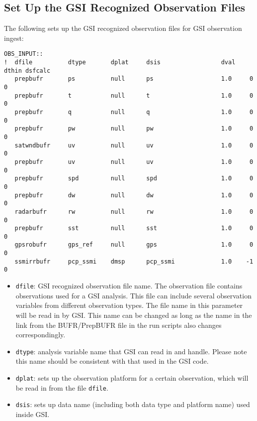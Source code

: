 \subsection{Set Up the GSI Recognized Observation Files}

The following sets up the GSI recognized observation files for GSI observation ingest:

\begin{scriptsize}
\begin{verbatim}
OBS_INPUT::
!  dfile          dtype       dplat     dsis                 dval    dthin dsfcalc
   prepbufr       ps          null      ps                   1.0     0     0
   prepbufr       t           null      t                    1.0     0     0
   prepbufr       q           null      q                    1.0     0     0
   prepbufr       pw          null      pw                   1.0     0     0
   satwndbufr     uv          null      uv                   1.0     0     0
   prepbufr       uv          null      uv                   1.0     0     0
   prepbufr       spd         null      spd                  1.0     0     0
   prepbufr       dw          null      dw                   1.0     0     0
   radarbufr      rw          null      rw                   1.0     0     0
   prepbufr       sst         null      sst                  1.0     0     0
   gpsrobufr      gps_ref     null      gps                  1.0     0     0
   ssmirrbufr     pcp_ssmi    dmsp      pcp_ssmi             1.0    -1     0
\end{verbatim}
\end{scriptsize}

\begin{itemize}
\item \verb|dfile|: GSI recognized observation file name. The observation file contains observations used for a GSI analysis. This file can include several observation variables from different observation types. The file name in this parameter will be read in by GSI. This name can be changed as long as the name in the link from the BUFR/PrepBUFR file in the run scripts also changes correspondingly.
\item \verb|dtype|: analysis variable name that GSI can read in and handle. Please note this name should be consistent with that used in the GSI code. 
\item \verb|dplat|: sets up the observation platform for a certain observation, which will be read in from the file \verb|dfile|.
\item \verb|dsis|: sets up data name (including both data type and platform name) used inside GSI.
\end{itemize}

